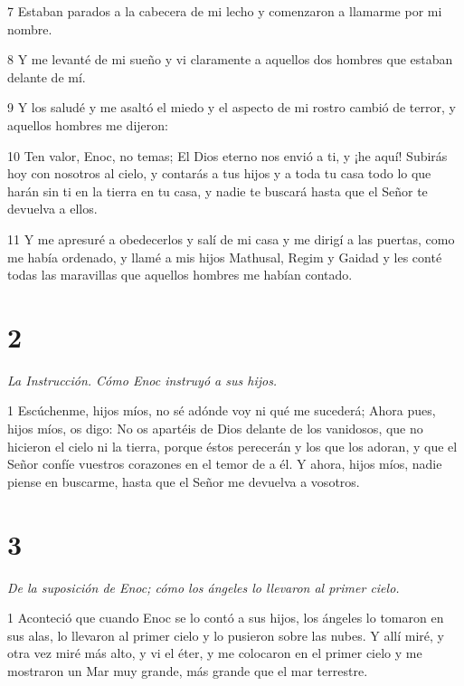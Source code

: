 \par 7 Estaban parados a la cabecera de mi lecho y comenzaron a llamarme por mi nombre.

\par 8 Y me levanté de mi sueño y vi claramente a aquellos dos hombres que estaban delante de mí.

\par 9 Y los saludé y me asaltó el miedo y el aspecto de mi rostro cambió de terror, y aquellos hombres me dijeron:

\par 10 Ten valor, Enoc, no temas; El Dios eterno nos envió a ti, y ¡he aquí! Subirás hoy con nosotros al cielo, y contarás a tus hijos y a toda tu casa todo lo que harán sin ti en la tierra en tu casa, y nadie te buscará hasta que el Señor te devuelva a ellos.

\par 11 Y me apresuré a obedecerlos y salí de mi casa y me dirigí a las puertas, como me había ordenado, y llamé a mis hijos Mathusal, Regim y Gaidad y les conté todas las maravillas que aquellos hombres me habían contado.

\chapter{2}

\par \textit{La Instrucción. Cómo Enoc instruyó a sus hijos.}

\par 1 Escúchenme, hijos míos, no sé adónde voy ni qué me sucederá; Ahora pues, hijos míos, os digo: No os apartéis de Dios delante de los vanidosos, que no hicieron el cielo ni la tierra, porque éstos perecerán y los que los adoran, y que el Señor confíe vuestros corazones en el temor de a él. Y ahora, hijos míos, nadie piense en buscarme, hasta que el Señor me devuelva a vosotros.

\chapter{3}

\par \textit{De la suposición de Enoc; cómo los ángeles lo llevaron al primer cielo.}

\par 1 Aconteció que cuando Enoc se lo contó a sus hijos, los ángeles lo tomaron en sus alas, lo llevaron al primer cielo y lo pusieron sobre las nubes. Y allí miré, y otra vez miré más alto, y vi el éter, y me colocaron en el primer cielo y me mostraron un Mar muy grande, más grande que el mar terrestre.

